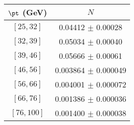 \begin{tabular}{c||c}
$\pt$ (GeV) & $N$  \\
\hline
$[25, 32]$ & 0.04412 $\pm$ 0.00028\\
$[32, 39]$ & 0.05034 $\pm$ 0.00040\\
$[39, 46]$ & 0.05666 $\pm$ 0.00061\\
$[46, 56]$ & 0.003864 $\pm$ 0.000049\\
$[56, 66]$ & 0.004001 $\pm$ 0.000072\\
$[66, 76]$ & 0.001386 $\pm$ 0.000036\\
$[76, 100]$ & 0.001400 $\pm$ 0.000038\\
\end{tabular}

